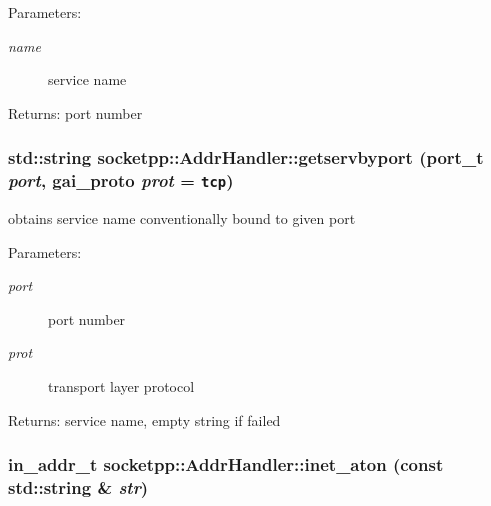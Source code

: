 \begin{Desc}
\item[Parameters:]
\begin{description}
\item[{\em name}]service name \end{description}
\end{Desc}
\begin{Desc}
\item[Returns:]port number \end{Desc}
\hypertarget{classsocketpp_1_1AddrHandler_c099c4bdf0b45e5d4a1e5806d896768e}{
\subsubsection[{getservbyport}]{\setlength{\rightskip}{0pt plus 5cm}std::string socketpp::AddrHandler::getservbyport (port\_\-t {\em port}, \/  gai\_\-proto {\em prot} = {\tt tcp})}}
\label{classsocketpp_1_1AddrHandler_c099c4bdf0b45e5d4a1e5806d896768e}


obtains service name conventionally bound to given port 

\begin{Desc}
\item[Parameters:]
\begin{description}
\item[{\em port}]port number \item[{\em prot}]transport layer protocol \end{description}
\end{Desc}
\begin{Desc}
\item[Returns:]service name, empty string if failed \end{Desc}
\hypertarget{classsocketpp_1_1AddrHandler_e2eda37cd4c20059c557e4e65c829cf8}{
\subsubsection[{inet\_\-aton}]{\setlength{\rightskip}{0pt plus 5cm}in\_\-addr\_\-t socketpp::AddrHandler::inet\_\-aton (const std::string \& {\em str})}}
\label{classsocketpp_1_1AddrHandler_e2eda37cd4c20059c557e4e65c829cf8}


